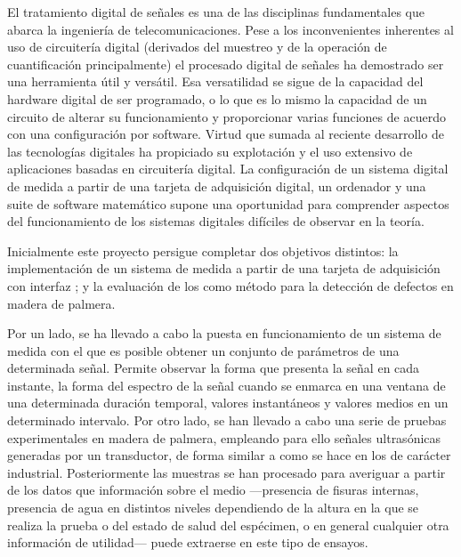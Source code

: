 \prosec{}


El tratamiento digital de señales es una de las disciplinas fundamentales
que abarca la ingeniería de telecomunicaciones. Pese a los inconvenientes
inherentes al uso de circuitería digital (derivados del muestreo y de la
operación de cuantificación principalmente) el procesado digital de señales
ha demostrado ser una herramienta útil y versátil. Esa versatilidad se
sigue de la capacidad del hardware digital de ser programado, o lo que es
lo mismo la capacidad de un circuito de alterar su funcionamiento y
proporcionar varias funciones de acuerdo con una configuración por
software. Virtud que sumada al reciente desarrollo de las tecnologías
digitales ha propiciado su explotación y el uso extensivo de aplicaciones
basadas en circuitería digital. La configuración de un sistema digital de
medida a partir de una tarjeta de adquisición digital, un ordenador y una
suite de software matemático supone una oportunidad para comprender
aspectos del funcionamiento de los sistemas digitales difíciles de observar
en la teoría.


\prosec{}


Inicialmente este proyecto persigue completar dos objetivos distintos: la
implementación de un sistema de medida a partir de una tarjeta de
adquisición con interfaz ; y la evaluación de los  como
método para la detección de defectos en madera de palmera.

Por un lado, se ha llevado a cabo la puesta en funcionamiento de un sistema
de medida con el que es posible obtener un conjunto de parámetros de una
determinada señal. Permite observar la forma que presenta la señal en cada
instante, la forma del espectro de la señal cuando se enmarca en una
ventana de una determinada duración temporal, valores instantáneos y
valores medios en un determinado intervalo. Por otro lado, se han llevado a
cabo una serie de pruebas experimentales en madera de palmera, empleando
para ello señales ultrasónicas generadas por un transductor, de forma
similar a como se hace en los  de carácter industrial.
Posteriormente las muestras se han procesado para averiguar a partir de los
datos que información sobre el medio ---presencia de fisuras internas,
presencia de agua en distintos niveles dependiendo de la altura en la que
se realiza la prueba o del estado de salud del espécimen, o en general
cualquier otra información de utilidad--- puede extraerse en este tipo de
ensayos.

